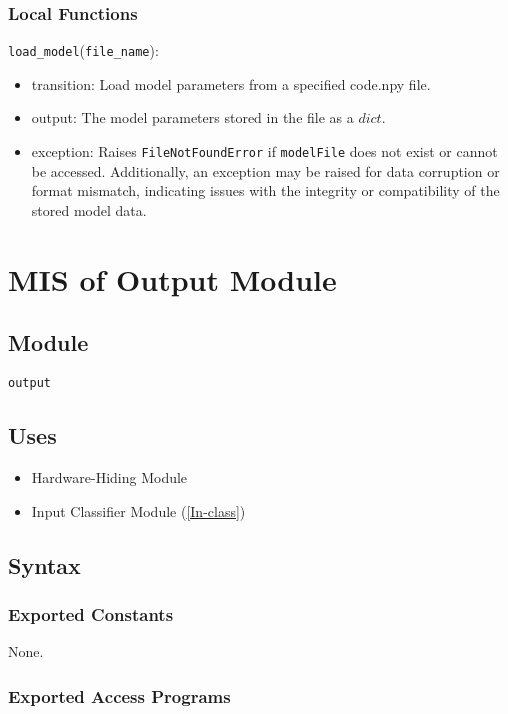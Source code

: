 \documentclass[12pt, titlepage]{article}
\def\code#1{\texttt{#1}}
\begin{document}
\subsubsection{Local Functions}
\noindent \code{load\_model}(\code{file\_name}):
\begin{itemize}
  \item transition: Load model parameters from a specified code{.npy} file.
  \item output: The model parameters stored in the file as a $dict$.
  \item exception: Raises \code{FileNotFoundError} if \code{modelFile} does not exist or cannot be accessed. 
  Additionally, an exception may be raised for data corruption or format mismatch, indicating issues 
  with the integrity or compatibility of the stored model data.
\end{itemize}
\newpage

\section{MIS of Output Module} \label{Output} 

\subsection{Module}
\code{output} 

\subsection{Uses}
\begin{itemize}
  \item Hardware-Hiding Module  
  \item Input Classifier Module (\ref{In-class})
\end{itemize}


\subsection{Syntax}

\subsubsection{Exported Constants}
None.

\subsubsection{Exported Access Programs}
\end{document}
